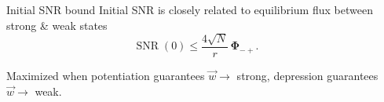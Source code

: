 \documentclass[final,hyperref={pdfpagelabels=false,bookmarks=false}]{beamer}
\DeclareMathOperator{\SNR}{SNR}
\DeclareMathOperator{\snr}{SNR}
\newcommand{\pot}{^\text{pot}}
\newcommand{\dep}{^\text{dep}}
\newcommand{\W}{\vec{w}}
\newcommand{\F}{\boldsymbol{\Phi}}
\begin{document}
\begin{frame}{}
\begin{columns}[t]
\begin{column}{0.37\linewidth}
\end{column}

\begin{column}{0.32\linewidth}



\begin{block}{Initial SNR bound}
%
 Initial SNR is closely related to equilibrium flux between strong \& weak states
 \begin{equation*}
   \SNR(0) \leq \frac{4\sqrt{N}}{r}\,\F_{-+}.
 \end{equation*}

 \vp
 Maximized when %
 potentiation guarantees $\W\to$ strong, %
 depression guarantees $\W\to$ weak.
%
 \begin{center}
   \hspace{1cm}

\end{center}
\end{block}
\end{column}
\end{columns}
\end{frame}
\end{document}
